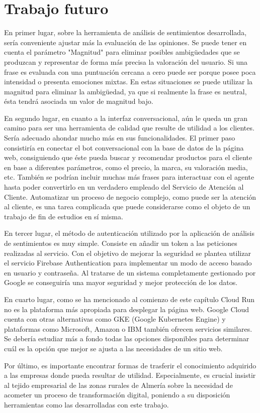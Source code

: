\section{Trabajo futuro}

En primer lugar, sobre la herramienta de análisis de sentimientos desarrollada, sería conveniente ajustar más la evaluación de las opiniones. Se puede tener en cuenta el parámetro "Magnitud" para eliminar posibles ambigüedades que se produzcan y representar de forma más precisa la valoración del usuario. Si una frase es evaluada con una puntuación cercana a cero puede ser porque posee poca intensidad o presenta emociones mixtas. En estas situaciones se puede utilizar la magnitud para eliminar la ambigüedad, ya que si realmente la frase es neutral, ésta tendrá asociada un valor de magnitud bajo. 

En segundo lugar, en cuanto a la interfaz conversacional, aún le queda un gran camino para ser una herramienta de calidad que resulte de utilidad a los clientes. Sería adecuado ahondar mucho más en sus funcionalidades. El primer paso consistiría en conectar el bot conversacional con la base de datos de la página web, consiguiendo que éste pueda buscar y recomendar productos para el cliente en base a diferentes parámetros, como el precio, la marca, su valoración media, etc. También se podrían incluir muchas más frases para interactuar con el agente hasta poder convertirlo en un verdadero empleado del Servicio de Atención al Cliente. Automatizar un proceso de negocio complejo, como puede ser la atención al cliente, es una tarea complicada que puede considerarse como el objeto de un trabajo de fin de estudios en sí misma.

En tercer lugar, el método de autenticación utilizado por la aplicación de análisis de sentimientos es muy simple. Consiste en añadir un token a las peticiones realizadas al servicio. Con el objetivo de mejorar la seguridad se plantea utilizar el servicio Firebase Authentication para implementar un modo de acceso basado en usuario y contraseña. Al tratarse de un sistema completamente gestionado por Google se conseguiría una mayor seguridad y mejor protección de los datos.

En cuarto lugar, como se ha mencionado al comienzo de este capítulo Cloud Run no es la plataforma más apropiada para desplegar la página web. Google Cloud cuenta con otras alternativas como GKE (Google Kubernetes Engine) y plataformas como Microsoft, Amazon o IBM también ofrecen servicios similares. Se debería estudiar más a fondo todas las opciones disponibles para determinar cuál es la opción que mejor se ajusta a las necesidades de un sitio web.

Por último, es importante encontrar formas de trasferir el conocimiento adquirido a las empresas donde pueda resultar de utilidad. Especialmente, es crucial insistir al tejido empresarial de las zonas rurales de Almería sobre la necesidad de acometer un proceso de transformación digital, poniendo a su disposición herramientas como las desarrolladas con este trabajo.